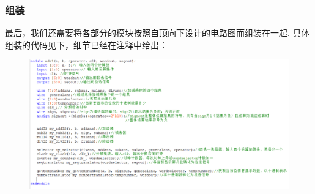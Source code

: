 \documentclass[UTF8]{ctexart}
\begin{document}
\subsubsection{组装}
最后，我们还需要将各部分的模块按照自顶向下设计的电路图而组装在一起. 具体组装的代码见下，细节已经在注释中给出：
\begin{figure}[H]\begin{center}
    \includegraphics[scale=0.65]{main.PNG}
\end{center}\end{figure}
\end{document}

